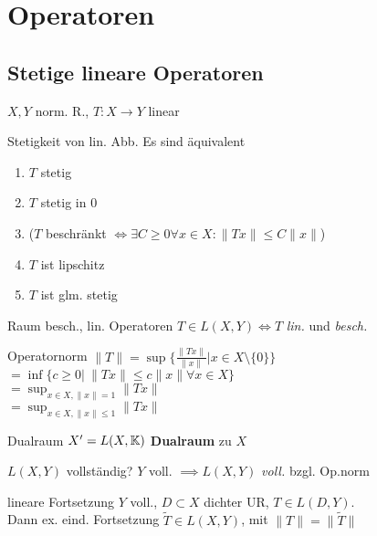 \section{Operatoren}


\subsection{Stetige lineare Operatoren}
$X,Y$ norm. R., $T:X\to Y$ linear\\
\begin{satz}{Stetigkeit von lin. Abb.}
  Es sind äquivalent
  \begin{enumerate}[label = (\roman*)]
    \item $T$ stetig
    \item $T$ stetig in $0$
    \item ($T$ beschränkt $\Leftrightarrow \exists C \geq 0 \forall x \in X:
      \|Tx\| \leq C\|x\|$)
    \item $T$ ist lipschitz
    \item $T$ ist glm. stetig
  \end{enumerate}
\end{satz}

\begin{definition}{Raum besch., lin. Operatoren}
  $T \in L(X,Y) \Leftrightarrow T$ \textit{lin.} und \textit{besch.}
\end{definition}

\begin{definition}{Operatornorm}
  \(
    \|T\| = \sup \{ \frac{\|Tx\|}{\|x\|}| x\in X \setminus \{0\}\}
  \)\\
  \(
    = \inf \{ c \geq 0|\ \|Tx\| \leq c \|x\| \forall x\in X \}
  \)\\
  \(
    = \sup_{x\in X, \|x\| = 1}\|Tx\|
  \)\\
  \(
    = \sup_{x\in X, \|x\| \leq 1}\|Tx\|
  \)
\end{definition}

\begin{definition}{Dualraum}
  $X' = L(X,\mathbb{K})$ \textbf{Dualraum} zu $X$
\end{definition}

\begin{satz}{$L(X,Y)$ vollständig?}
  $Y$ voll. $\implies L(X,Y)$ \textit{voll.} bzgl. Op.norm
\end{satz}

\begin{satz}{lineare Fortsetzung}
  $Y$ voll., $D \subset X$ dichter UR, $T \in L(D,Y)$.\\
  Dann ex. eind. Fortsetzung $\tilde{T} \in L(X,Y)$, mit $\|T\|=\|\tilde{T}\|$
\end{satz}

